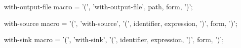 \begin{optDefinition}
\Syntax
\savesyntax\withoutputfileSyntax\vbox{\syntax
with-output-file macro
   = '(', 'with-output-file', path,  {form}, ')';
\endsyntax}

\Syntax
\savesyntax\withsourceSyntax\vbox{\syntax
with-source macro
   = '(', 'with-source',
          '(', identifier, expression, ')',
          {form}, ')';
\endsyntax}

\Syntax
\savesyntax\withsinkSyntax\vbox{\syntax
with-sink macro
   = '(', 'with-sink',
          '(', identifier, expression, ')',
          {form}, ')';
\endsyntax}

\end{optDefinition}
%
